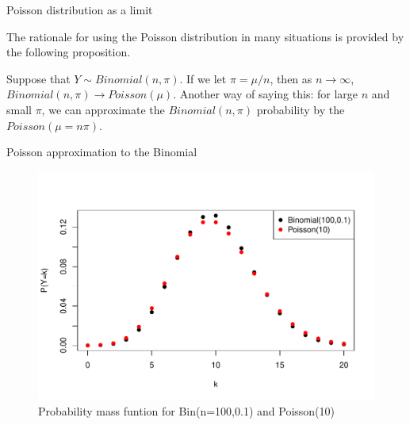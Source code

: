 \documentclass[10pt]{beamer}\usepackage[]{graphicx}\usepackage[]{color}
\makeatletter
\def\maxwidth{ %
  \ifdim\Gin@nat@width>\linewidth
    \linewidth
  \else
    \Gin@nat@width
  \fi
}
\newenvironment{knitrout}{}{} %
\makeatother
\begin{document}
\begin{frame}{Poisson distribution as a limit}
	
	The rationale for using the Poisson distribution in many situations is provided by the following proposition.
	
	\vspace*{0.5in}
	
	\begin{proposition}
		Suppose that $Y \sim Binomial(n,\pi)$. If we let $\pi = \mu/n$, then as $n \rightarrow \infty$, $Binomial(n,\pi) \rightarrow Poisson(\mu)$. Another way of saying this: for large $n$ and small $\pi$, we can approximate the $Binomial(n,\pi)$ probability by the $Poisson(\mu = n\pi)$. 
	\end{proposition}
	
\end{frame}


\begin{frame}{Poisson approximation to the Binomial}
	
	
\begin{knitrout}\tiny
{}\color{fgcolor}\begin{figure}

{\centering \includegraphics[width=\maxwidth]{figure/unnamed-chunk-12-1} 

}

\caption[Probability mass funtion for Bin(n=100,0.1) and Poisson(10)]{Probability mass funtion for Bin(n=100,0.1) and Poisson(10)}\label{fig:unnamed-chunk-12}
\end{figure}


\end{knitrout}
	
\end{frame}
\end{document}
